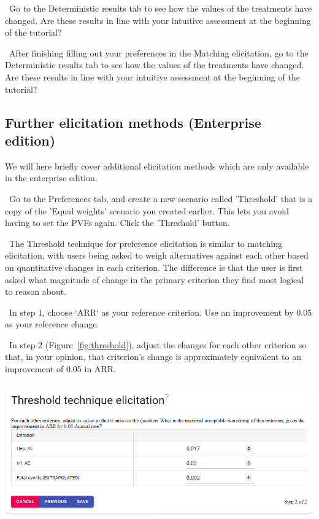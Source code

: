 \documentclass[00_mcda_tutorial.tex]{subfiles}
\begin{document}
\noindent \leftpointright \, Go to the Deterministic results tab to see how the values of the treatments have changed. Are these results in line with your intuitive assessment at the beginning of the tutorial?

\noindent \leftpointright \, After finishing filling out your preferences in the Matching elicitation, go to the Deterministic results tab to see how the values of the treatments have changed. Are these results in line with your intuitive assessment at the beginning of the tutorial?


\begin{sidebar*}

\subsection*{Further elicitation methods (Enterprise edition)}

We will here briefly cover additional elicitation methods which are only available in the enterprise edition.
\newline

\noindent \leftpointright \, Go to the Preferences tab, and create a new scenario called 'Threshold' that is a copy of the 'Equal weights' scenario you created earlier. This lets you avoid having to set the PVFs again. Click the 'Threshold' button.
\newline


\noindent \faGraduationCap \, The Threshold technique for preference elicitation is similar to matching elicitation, with users being asked to weigh alternatives against each other based on quantitative changes in each criterion. The difference is that the user is first asked what magnitude of change in the primary criterion they find most logical to reason about.
\newline

\noindent \leftpointright \, In step 1, choose `ARR` as your reference criterion. Use an improvement by 0.05 as your reference change.
\newline

\noindent \leftpointright \, In step 2 (Figure~\ref{fig:threshold}), adjust the changes for each other criterion so that, in your opinion, that criterion's change is approximately equivalent to an improvement of 0.05 in ARR.
\newline

{
	\centering
    \includegraphics[width=\textwidth]{fig/threshold.png}
    \label{fig:threshold}
    \par
}


\end{sidebar*}
\end{document}
